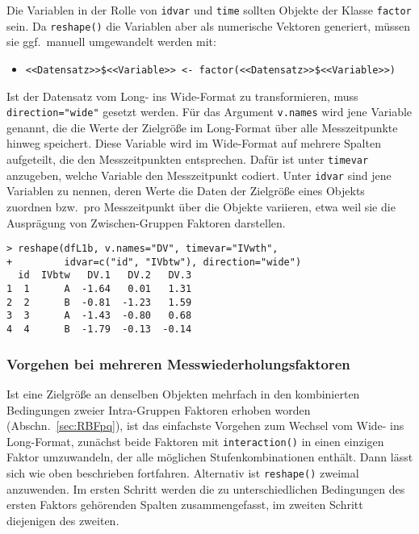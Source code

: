 Die Variablen in der Rolle von \lstinline!idvar! und \lstinline!time! sollten Objekte der Klasse \lstinline!factor! sein. Da \lstinline!reshape()! die Variablen aber als numerische Vektoren generiert, müssen sie ggf.\ manuell umgewandelt werden mit:
\begin{itemize}
\item \lstinline!<<Datensatz>>$<<Variable>> <- factor(<<Datensatz>>$<<Variable>>)!
\end{itemize}

Ist der Datensatz vom Long- ins Wide-Format zu transformieren, muss \lstinline!direction="wide"! gesetzt werden. Für das Argument \lstinline!v.names! wird jene Variable genannt, die die Werte der Zielgröße im Long-Format über alle Messzeitpunkte hinweg speichert. Diese Variable wird im Wide-Format auf mehrere Spalten aufgeteilt, die den Messzeitpunkten entsprechen. Dafür ist unter \lstinline!timevar! anzugeben, welche Variable den Messzeitpunkt codiert. Unter \lstinline!idvar! sind jene Variablen zu nennen, deren Werte die Daten der Zielgröße eines Objekts zuordnen bzw.\ pro Messzeitpunkt über die Objekte variieren, etwa weil sie die Ausprägung von Zwischen-Gruppen Faktoren darstellen.
\begin{lstlisting}
> reshape(dfL1b, v.names="DV", timevar="IVwth",
+         idvar=c("id", "IVbtw"), direction="wide")
  id  IVbtw   DV.1   DV.2   DV.3
1  1      A  -1.64   0.01   1.31
2  2      B  -0.81  -1.23   1.59
3  3      A  -1.43  -0.80   0.68
4  4      B  -1.79  -0.13  -0.14
\end{lstlisting}

\subsubsection{Vorgehen bei mehreren Messwiederholungsfaktoren}

Ist eine Zielgröße an denselben Objekten mehrfach in den kombinierten Bedingungen zweier Intra-Gruppen Faktoren erhoben worden (Abschn.\ \ref{sec:RBFpq}), ist das einfachste Vorgehen zum Wechsel vom Wide- ins Long-Format, zunächst beide Faktoren mit \lstinline!interaction()! in einen einzigen Faktor umzuwandeln, der alle möglichen Stufenkombinationen enthält. Dann lässt sich wie oben beschrieben fortfahren. Alternativ ist \lstinline!reshape()! zweimal anzuwenden. Im ersten Schritt werden die zu unterschiedlichen Bedingungen des ersten Faktors gehörenden Spalten zusammengefasst, im zweiten Schritt diejenigen des zweiten.

